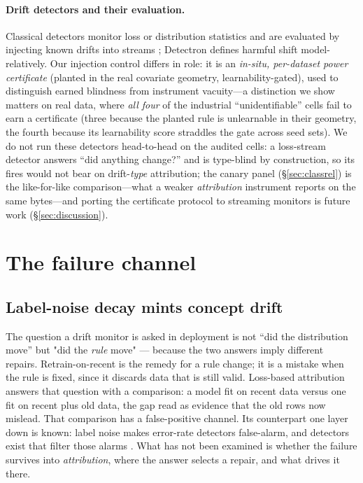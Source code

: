 \documentclass[10pt]{article} %
\begin{document}
\paragraph{Drift detectors and their evaluation.} Classical detectors \citep[surveys:][]{gama2014survey,lu2019learning}
monitor loss or distribution statistics and are evaluated by injecting known drifts
into streams \citep{poenaruolaru2022reliable}; Detectron \citep{ginsberg2023detectron} defines harmful
shift model-relatively. Our injection control differs in role: it is an \emph{in-situ, per-dataset
power certificate} (planted in the real covariate geometry, learnability-gated), used to
distinguish earned blindness from instrument vacuity---a distinction we show matters on real
data, where \emph{all four} of the industrial ``unidentifiable'' cells fail to earn a certificate
(three because the planted rule is unlearnable in their geometry, the fourth because its
learnability score straddles the gate across seed sets). We do not run
these detectors head-to-head on the audited cells: a loss-stream detector answers ``did anything
change?'' and is type-blind by construction, so its fires would not bear on drift-\emph{type}
attribution; the canary panel (\S\ref{sec:classrel}) is the like-for-like comparison---what a
weaker \emph{attribution} instrument reports on the same bytes---and porting the certificate
protocol to streaming monitors is future work (\S\ref{sec:discussion}).

\section{The failure channel}\label{sec:channel}

\subsection{Label-noise decay mints concept drift}\label{sec:noisechannel}

The question a drift monitor is asked in deployment is not ``did the distribution move'' but "did
the \emph{rule} move" --- because the two answers imply different repairs. Retrain-on-recent is the
remedy for a rule change; it is a mistake when the rule is fixed, since it discards data that is
still valid. Loss-based attribution answers that question with a comparison: a model fit on recent
data versus one fit on recent plus old data, the gap read as evidence that the old rows now
mislead. That comparison has a false-positive channel. Its counterpart one layer down is known:
label noise makes error-rate detectors false-alarm, and detectors exist that filter those
alarms \citep{wang2022noise}. What has not been examined is whether the failure survives into
\emph{attribution}, where the answer selects a repair, and what drives it there.
\end{document}
